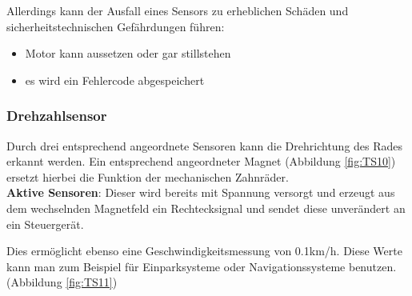 				Allerdings kann der Ausfall eines Sensors zu erheblichen Schäden und sicherheitstechnischen Gefährdungen führen:
				\begin{itemize}
					\item Motor kann aussetzen oder gar stillstehen
					\item es wird ein Fehlercode abgespeichert
	            \end{itemize}
	           
	           
	           \subsubsection{Drehzahlsensor}
		           
		           Durch drei entsprechend angeordnete Sensoren kann die Drehrichtung des Rades erkannt werden. Ein entsprechend angeordneter Magnet (Abbildung \ref{fig:TS10}) ersetzt hierbei die Funktion der mechanischen Zahnräder.\\
		           \textbf{Aktive Sensoren}: Dieser wird bereits mit Spannung versorgt und erzeugt aus dem wechselnden Magnetfeld ein Rechtecksignal und sendet diese unverändert an ein Steuergerät.
		           
		           Dies ermöglicht ebenso eine Geschwindigkeitsmessung von 0.1km/h. Diese Werte kann man zum Beispiel für Einparksysteme oder Navigationssysteme benutzen.\cite{TS_drehzahl_sensor}
		           (Abbildung \ref{fig:TS11})
		           
